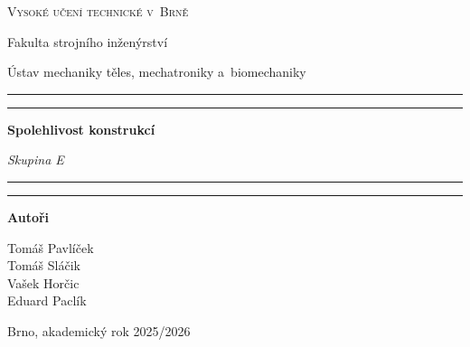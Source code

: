 \documentclass[12pt,a4paper]{article}
\begin{document}
\thispagestyle{empty}
\begin{center}

{\large\scshape Vysoké učení technické v~Brně\par}
\vspace{0.5em}
{\large Fakulta strojního inženýrství\par}
\vspace{0.3em}
{\normalsize Ústav mechaniky těles, mechatroniky a~biomechaniky\par}

\vspace{1.2cm}
\rule{\textwidth}{1.2pt}\par
\vspace{0.4em}
\rule{\textwidth}{0.4pt}

\vfill

{\Huge\bfseries Spolehlivost konstrukcí\par}
\vspace{2em}
{\large\itshape Skupina E\par}

\vfill

\rule{\textwidth}{0.4pt}\par
\vspace{0.4em}
\rule{\textwidth}{1.2pt}

\vspace{1.2cm}

{\large\bfseries Autoři\par}
\vspace{0.6em}
{\large%
Tomáš Pavlíček\\[0.2em]
Tomáš Sláčik\\[0.2em]
Vašek Horčic\\[0.2em]
Eduard Paclík\par}

\vspace{1.8cm}

{Brno, akademický rok 2025/2026\par}

\end{center}
\end{document}
